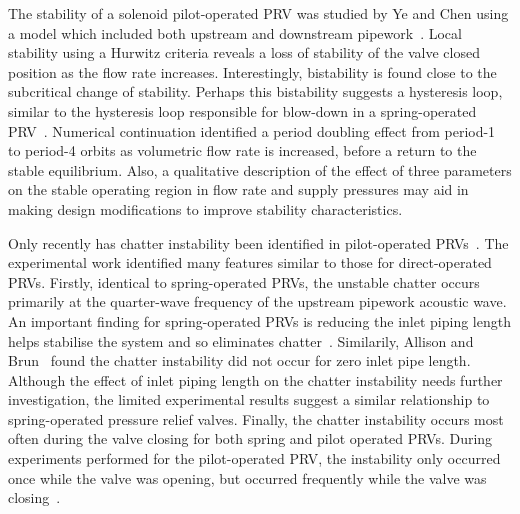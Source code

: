 The stability of a solenoid pilot-operated PRV was studied by Ye and Chen using a model which included both upstream and downstream pipework~\cite{Ye2009DynamicSystem}.
Local stability using a Hurwitz criteria reveals a loss of stability of the valve closed position as the flow rate increases. Interestingly, bistability is found close to the subcritical change of stability. Perhaps this bistability suggests a hysteresis loop, similar to the hysteresis loop responsible for blow-down in a spring-operated PRV~\cite{ErdodiTheEstimation}. Numerical continuation identified a period doubling effect from period-1 to period-4 orbits as volumetric flow rate is increased, before a return to the stable equilibrium. Also, a qualitative description of the effect of three parameters on the stable operating region in flow rate and supply pressures may aid in making design modifications to improve stability characteristics.

\newpage
%
Only recently has chatter instability been identified in pilot-operated PRVs~\cite{Allison2015TestingValves}. The experimental work identified many features similar to those for direct-operated PRVs. Firstly, identical to spring-operated PRVs, the unstable chatter occurs primarily at the quarter-wave frequency of the upstream pipework acoustic wave.
%
An important finding for spring-operated PRVs is reducing the inlet piping length helps stabilise the system and so eliminates chatter~\cite{Hos2014DynamicMechanisms}. Similarily, Allison and Brun~\cite{Allison2015TestingValves} found the chatter instability did not occur for zero inlet pipe length. Although the effect of inlet piping length on the chatter instability needs further investigation, the limited experimental results suggest a similar relationship to spring-operated pressure relief valves.
%
Finally, the chatter instability occurs most often during the valve closing for both spring and pilot operated PRVs. During experiments performed for the pilot-operated PRV, the instability only occurred once while the valve was opening, but occurred frequently while the valve was closing~\cite{Allison2015TestingValves}.









